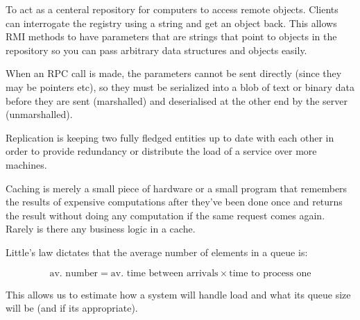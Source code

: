 
To act as a centeral repository for computers to access remote objects. Clients
can interrogate the registry using a string and get an object back. This allows
RMI methods to have parameters that are strings that point to objects in the
repository so you can pass arbitrary data structures and objects easily.


When an RPC call is made, the parameters cannot be sent directly (since they may
be pointers etc), so they must be serialized into a blob of text or binary data
before they are sent (marshalled) and deserialised at the other end by the
server (unmarshalled).


Replication is keeping two fully fledged entities up to date with each other in
order to provide redundancy or distribute the load of a service over more
machines.

Caching is merely a small piece of hardware or a small program that remembers
the results of expensive computations after they've been done once and returns
the result without doing any computation if the same request comes again. Rarely
is there any business logic in a cache.


Little's law dictates that the average number of elements in a queue is:

\[
  \text{av. number} = \text{av. time between arrivals} \times \text{time to process one}
\]

This allows us to estimate how a system will handle load and what its queue size
will be (and if its appropriate).


